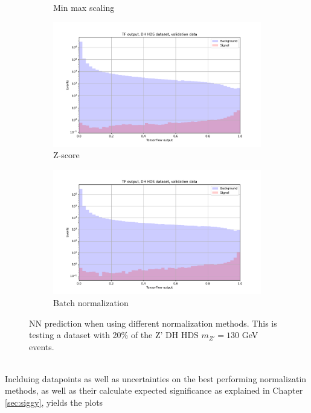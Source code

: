 \documentclass[12pt, a4paper]{book}
\begin{document}
\begin{figure}[!ht]
\begin{subfigure}[b]{0.49\textwidth}
      \caption{Min max scaling}
   \end{subfigure}
   \hfill
   \begin{subfigure}[b]{0.49\textwidth}
      \centering
      \includegraphics[width=1\textwidth]{Z_score/VAL_pre.pdf}
      \caption{Z-score}
   \end{subfigure}
   \hfill
   \begin{subfigure}[b]{0.49\textwidth}
      \centering
      \includegraphics[width=1\textwidth]{BatchNorm/VAL_pre.pdf}
      \caption{Batch normalization}
   \end{subfigure}
   \caption[Different normaliazation methods for NNs]{NN prediction when using different normalization methods. This is testing a dataset with 20\% of the Z' DH HDS $m_{Z'}=130$ GeV events.}\label{fig:DifferentNormalizations}
\end{figure}
\\Inclduing datapoints as well as uncertainties on the best performing normalizatin methods, as well as their calculate expected significance as explained in Chapter \ref{sec:siggy}, yields the plots
\end{document}
